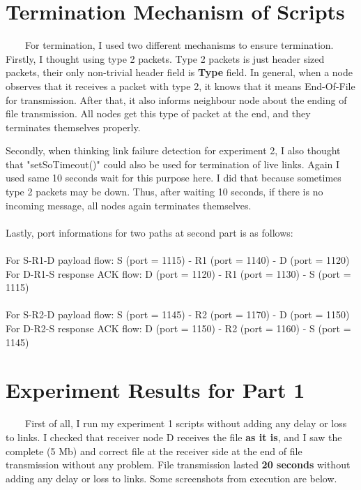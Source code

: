 \documentclass[12pt]{article}
\begin{document}
\section{Termination Mechanism of Scripts}
\ \ \ \ For termination, I used two different mechanisms to ensure termination. Firstly, I thought using type 2 packets. Type 2 packets is just header sized packets, their only non-trivial header field is \textbf{Type} field. In general, when a node observes that it receives a packet with type 2, it knows that it means End-Of-File for transmission. After that, it also informs neighbour node about the ending of file transmission. All nodes get this type of packet at the end, and they terminates themselves properly.

Secondly, when thinking link failure detection for experiment 2, I also thought that "setSoTimeout()" could also be used for termination of live links. Again I used same 10 seconds wait for this purpose here. I did that because sometimes type 2 packets may be down. Thus, after waiting 10 seconds, if there is no incoming message, all nodes again terminates themselves. \\
\\

Lastly, port informations for two paths at second part is as follows: \\
\\
For S-R1-D payload flow: S (port = 1115) - R1 (port = 1140) - D (port = 1120) \\
For D-R1-S response ACK flow: D (port = 1120) - R1 (port = 1130) - S (port = 1115) \\
\\
For S-R2-D payload flow: S (port = 1145) - R2 (port = 1170) - D (port = 1150) \\
For D-R2-S response ACK flow: D (port = 1150) - R2 (port = 1160) - S (port = 1145) \\


\section{Experiment Results for Part 1}
\ \ \ \ First of all, I run my experiment 1 scripts without adding any delay or loss to links. I checked that receiver node D receives the file \textbf{as it is}, and I saw the complete (5 Mb) and correct file at the receiver side at the end of file transmission without any problem. File transmission lasted \textbf{20 seconds} without adding any delay or loss to links. Some screenshots from execution are below.
\end{document}

